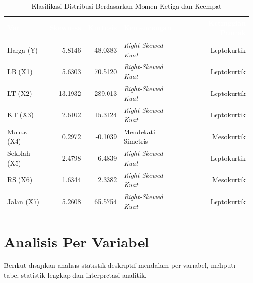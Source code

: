 \documentclass[12pt,a4paper]{article}
\begin{document}
\begin{table}[H]
\centering
\caption{Klasifikasi Distribusi Berdasarkan Momen Ketiga dan Keempat}
\label{tab:distribusi}
\small
\begin{tabular}{lrrlr}
\toprule
\rowcolor{headerblue}
\textcolor{white}{\textbf{Var}} &
\textcolor{white}{\textbf{Skewness}} &
\textcolor{white}{\textbf{Kurtosis}} &
\textcolor{white}{\textbf{Kemencengan}} &
\textcolor{white}{\textbf{Ketinggian Puncak}} \\
\midrule
\rowcolor{rowlight}
Harga (Y) & 5.8146 & 48.0383 & \textit{Right-Skewed Kuat} & Leptokurtik \\
LB (X1) & 5.6303 & 70.5120 & \textit{Right-Skewed Kuat} & Leptokurtik \\
\rowcolor{rowlight}
LT (X2) & 13.1932 & 289.013 & \textit{Right-Skewed Kuat} & Leptokurtik \\
KT (X3) & 2.6102 & 15.3124 & \textit{Right-Skewed Kuat} & Leptokurtik \\
\rowcolor{rowlight}
Monas (X4) & 0.2972 & -0.1039 & Mendekati Simetris & Mesokurtik \\
Sekolah (X5) & 2.4798 & 6.4839 & \textit{Right-Skewed Kuat} & Leptokurtik \\
\rowcolor{rowlight}
RS (X6) & 1.6344 & 2.3382 & \textit{Right-Skewed Kuat} & Mesokurtik \\
Jalan (X7) & 5.2608 & 65.5754 & \textit{Right-Skewed Kuat} & Leptokurtik \\
\bottomrule
\end{tabular}
\end{table}

\newpage
\section{Analisis Per Variabel}

Berikut disajikan analisis statistik deskriptif mendalam per variabel, meliputi
tabel statistik lengkap dan interpretasi analitik.
\end{document}
